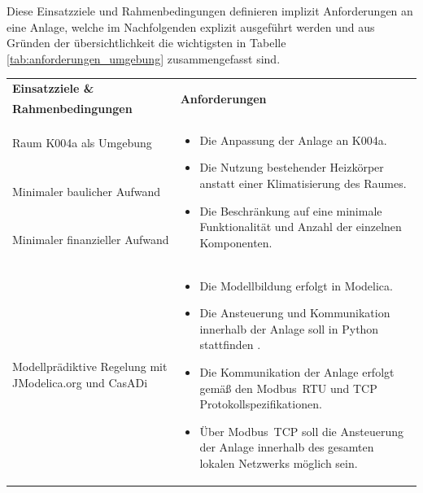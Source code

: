 Diese Einsatzziele und Rahmenbedingungen definieren implizit Anforderungen an eine Anlage, welche im Nachfolgenden explizit ausgeführt werden und aus Gründen der übersichtlichkeit die wichtigsten in Tabelle \ref{tab:anforderungen_umgebung} zusammengefasst sind.


\begin{table}[H]
\centering
\small
\renewcommand{\arraystretch}{1.3}
\begin{tabularx}{1\textwidth}{m{}m{}}

\toprule

\textbf{Einsatzziele \&} & \multirow{2}{\hsize}{\textbf{Anforderungen}} \\ 
\textbf{Rahmenbedingungen} & \\

\cmidrule[0.5pt](r{0.25em}){1-1} 
\cmidrule[0.5pt](l{0.25em}){2-2}

Raum K004a als Umgebung  & \multirow{3}{\hsize}{
\begin{minipage}[t]{0.57\textwidth}
\begin{itemize}[itemsep=0pt,topsep=0pt,leftmargin=5mm]
	\item Die Anpassung der Anlage an K004a.
	\item Die Nutzung bestehender Heizkörper anstatt einer Klimatisierung des Raumes. 
	\item Die Beschränkung auf eine minimale Funktionalität und Anzahl der einzelnen Komponenten. 
\end{itemize}
\end{minipage}
}
 \\
	
\cmidrule[0.1pt](lr{2em}){1-1} 
Minimaler baulicher Aufwand & \\

\cmidrule[0.1pt](lr{2em}){1-1} 
Minimaler finanzieller \newline Aufwand &\\ 



\cmidrule[0.5pt](r{0.25em}){1-1} 
\cmidrule[0.5pt](l{0.25em}){2-2}

\addlinespace[4mm] Modellprädiktive Regelung mit JModelica.org und CasADi \newline & \multirow{3}{\hsize}{
\begin{minipage}[t]{0.57\textwidth}
\begin{itemize}[itemsep=0pt,topsep=0pt,leftmargin=5mm]
\item Die Modellbildung erfolgt in Modelica.
\item Die Ansteuerung und Kommunikation innerhalb der Anlage soll in Python stattfinden	.
\item Die Kommunikation der Anlage erfolgt gemäß den Modbus~RTU und TCP Protokollspezifikationen.
\item Über Modbus~TCP soll die Ansteuerung der Anlage innerhalb des gesamten lokalen Netzwerks möglich sein.
\end{itemize}
\end{minipage}
}  \\


\end{tabularx}
\end{table}

